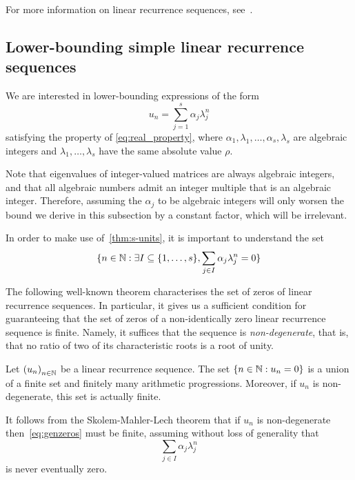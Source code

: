 For more information on linear recurrence sequences, see~\cite{BOOK}.

\subsection{Lower-bounding simple linear recurrence sequences}
\label{sec:s-units-app}

We are interested in lower-bounding expressions of the form
\begin{equation}
\label{eq:sum}
u_{n}=\sum\limits_{j=1}^{s}\alpha_{j}\lambda_j^{n}
\end{equation}
satisfying the property of \cref{eq:real_property}, where $\alpha_{1}, \lambda_{1}, \ldots, \alpha_{s}, \lambda_{s}$ are algebraic integers and $\lambda_{1},\ldots,\lambda_{s}$ have the same absolute value $\rho$.

Note that eigenvalues of integer-valued matrices are always algebraic integers, and that all algebraic numbers admit an integer multiple that is an algebraic integer. Therefore, assuming the $\alpha_{j}$ to be algebraic integers will only worsen the bound we derive in this subsection by a constant factor, which will be irrelevant.

In order to make use of~\cref{thm:s-units}, it is important to understand the set
\begin{equation}
\lbrace n\in\Naturals: \exists I\subseteq \lbrace 1,\ldots,s\rbrace, \sum\limits_{j\in I}\alpha_j\lambda_j^n=0\rbrace
\label{eq:genzeros}
\end{equation}

The following well-known theorem characterises the set of zeros of linear recurrence sequences. In particular, it gives us a sufficient condition for guaranteeing that the set of zeros of a non-identically zero linear recurrence sequence is finite. Namely, it suffices that the sequence is \emph{non-degenerate}, that is, that no ratio of two of its characteristic roots is a root of unity.

\begin{theorem}
Let ${(u_{n})}_{n \in \mathbb{N}}$ be a linear recurrence sequence. The set $\lbrace n\in\mathbb{N}: u_n=0\rbrace$ is a union of a finite set and finitely many arithmetic progressions. Moreover, if $u_n$ is non-degenerate, this set is actually finite.
\end{theorem}

It follows from the Skolem-Mahler-Lech theorem that if $u_n$ is non-degenerate  then~\eqref{eq:genzeros} must be finite, assuming without loss of generality that
\begin{equation*}
\sum\limits_{j\in I}\alpha_j\lambda_j^n
\end{equation*}
is never eventually zero.

